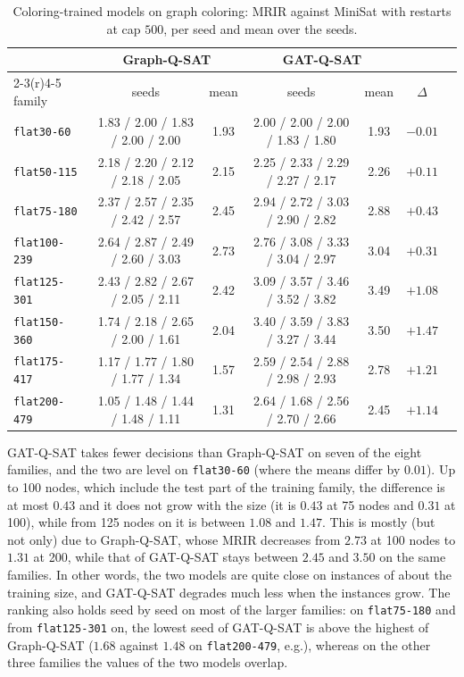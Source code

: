 \documentclass[11pt,a4paper]{article}
\newcommand{\code}[1]{\texttt{\def\_{\textunderscore\allowbreak}#1}}
\begin{document}
\begin{table}[ht]\centering\small
\setlength{\tabcolsep}{3pt}
\begin{tabular}{lcccccr}
\toprule
 & \multicolumn{2}{c}{Graph-Q-SAT} & \multicolumn{2}{c}{GAT-Q-SAT} & \\
\cmidrule(r){2-3}\cmidrule(r){4-5}
family & seeds & mean & seeds & mean & $\Delta$ \\
\midrule
\code{flat30-60} & 1.83 / 2.00 / 1.83 / 2.00 / 2.00 & 1.93 & 2.00 / 2.00 / 2.00 / 1.83 / 1.80 & 1.93 & $-0.01$ \\
\code{flat50-115} & 2.18 / 2.20 / 2.12 / 2.18 / 2.05 & 2.15 & 2.25 / 2.33 / 2.29 / 2.27 / 2.17 & 2.26 & $+0.11$ \\
\code{flat75-180} & 2.37 / 2.57 / 2.35 / 2.42 / 2.57 & 2.45 & 2.94 / 2.72 / 3.03 / 2.90 / 2.82 & 2.88 & $+0.43$ \\
\code{flat100-239} & 2.64 / 2.87 / 2.49 / 2.60 / 3.03 & 2.73 & 2.76 / 3.08 / 3.33 / 3.04 / 2.97 & 3.04 & $+0.31$ \\
\code{flat125-301} & 2.43 / 2.82 / 2.67 / 2.05 / 2.11 & 2.42 & 3.09 / 3.57 / 3.46 / 3.52 / 3.82 & 3.49 & $+1.08$ \\
\code{flat150-360} & 1.74 / 2.18 / 2.65 / 2.00 / 1.61 & 2.04 & 3.40 / 3.59 / 3.83 / 3.27 / 3.44 & 3.50 & $+1.47$ \\
\code{flat175-417} & 1.17 / 1.77 / 1.80 / 1.77 / 1.34 & 1.57 & 2.59 / 2.54 / 2.88 / 2.98 / 2.93 & 2.78 & $+1.21$ \\
\code{flat200-479} & 1.05 / 1.48 / 1.44 / 1.48 / 1.11 & 1.31 & 2.64 / 1.68 / 2.56 / 2.70 / 2.66 & 2.45 & $+1.14$ \\
\bottomrule
\end{tabular}
\caption{Coloring-trained models on graph coloring: MRIR against MiniSat
with restarts at cap $500$, per seed and mean over the seeds.}
\label{tab:numbers}
\end{table}

\noindent
GAT-Q-SAT takes fewer decisions than Graph-Q-SAT on seven of the eight
families, and the two are level on \code{flat30-60} (where the means differ by
$0.01$). Up to 100 nodes, which include the test part of the training family,
the difference is at most $0.43$ and it does not grow with the size (it is
$0.43$ at 75 nodes and $0.31$ at 100), while from 125 nodes on it is between
$1.08$ and $1.47$. This is mostly (but not only) due to Graph-Q-SAT, whose MRIR
decreases from $2.73$ at 100 nodes to $1.31$ at 200, while that of GAT-Q-SAT
stays between $2.45$ and $3.50$ on the same families. In other words, the two
models are quite close on instances of about the training size, and GAT-Q-SAT
degrades much less when the instances grow. The ranking also holds seed by
seed on most of the larger families: on \code{flat75-180} and from
\code{flat125-301} on, the lowest seed of GAT-Q-SAT is above the highest of
Graph-Q-SAT ($1.68$ against $1.48$ on \code{flat200-479}, e.g.), whereas on the other three
families the values of the two models overlap.
\end{document}

